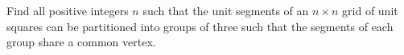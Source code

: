 Find all positive integers $n$ such that the unit segments of an $n \times n$ grid of unit squares can be partitioned into groups of three such that the segments of each group share a common vertex.